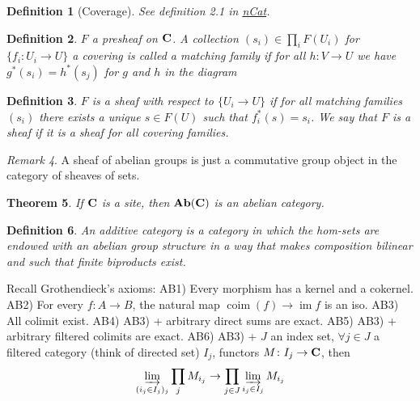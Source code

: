 \documentclass[A4paper, british, reqno]{amsart}
\theoremstyle{darkgreentheorem}
\newtheorem{thm}{Theorem}[section]
\theoremstyle{darkbluedefinition}
\newtheorem{defn}[thm]{Definition}
\theoremstyle{darkredexample}
\theoremstyle{remark}
\newtheorem{rem}[thm]{Remark}
\DeclareMathOperator{\im}{im}
\newcommand{\1}{\mathbbm{1}}
\begin{document}
\begin{defn}[Coverage]
    See definition 2.1 in \href{https://ncatlab.org/nlab/show/coverage}{nCat}.
\end{defn}

\begin{defn}
    $F$ a presheaf on $\mathbf{C}$.
    A collection $(s_{i})\in \prod_{i}F(U_{i})$ for $\{f_{i}\colon U_{i}\to U\}$ a covering is called a \textit{matching family} if for all $h\colon V\to U$ we have $g^{*}(s_{i})=h^{*}(s_{j})$ for $g$ and $h$ in the diagram
    \begin{center}
    \end{center}
\end{defn}

\begin{defn}
    $F$ is a sheaf with respect to $\{U_{i}\to U\}$ if for all matching families $(s_{i})$ there exists a unique $s\in F(U)$ such that $f_{i}^{*}(s)=s_{i}$.
    We say that $F$ is a \textit{sheaf} if it is a sheaf for all covering families.
\end{defn}

\begin{rem}
    A sheaf of abelian groups is just a commutative group object in the category of sheaves of sets.
\end{rem}

\begin{thm}
    If $\mathbf{C}$ is a site, then $\mathbf{Ab}(\mathbf{C})$ is an abelian category.
\end{thm}

\begin{defn}
    An additive category is a category in which the hom-sets are endowed with an abelian group structure in a way that makes composition bilinear and such that finite biproducts exist.
\end{defn}

Recall Grothendieck's axioms:
AB1) Every morphism has a kernel and a cokernel.
AB2) For every $f\colon A\to B$, the natural map $\operatorname{coim}(f)\to \im{f}$ is an iso.
AB3) All colimit exist.
AB4) AB3) + arbitrary direct sums are exact.
AB5) AB3) + arbitrary filtered colimits are exact.
AB6) AB3) + $J$ an index set, $\forall j\in J$ a filtered category (think of directed set) $I_{j}$, functors $M\colon I_{j}\to \mathbf{C}$, then
\[\varinjlim_{(i_{j}\in I_{j})_{j}}\prod_{j} M_{i_{j}}\to \prod_{j\in J}\varinjlim_{i_{j}\in I_{j}} M_{i_{j}} \]
\end{document}
